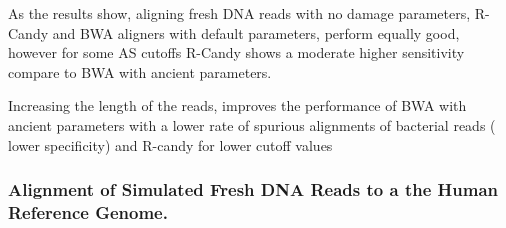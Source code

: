 \documentclass[11pt,a4paper]{report}
\begin{document}
As the results show, aligning fresh DNA reads with no damage parameters, 
R-Candy and BWA aligners with default parameters, perform equally good, 
however for some AS cutoffs R-Candy shows a moderate higher sensitivity 
compare to BWA with ancient parameters.

Increasing the length of the reads, improves the performance of BWA with
ancient parameters with a lower rate of spurious alignments of bacterial 
reads ( lower specificity) and R-candy for lower cutoff values



\subsubsection{ Alignment of Simulated Fresh DNA Reads to a the Human Reference Genome.}
\label{ Alignment of Simulated Fresh DNA Reads to a the Human Reference Genome.}
\end{document}

